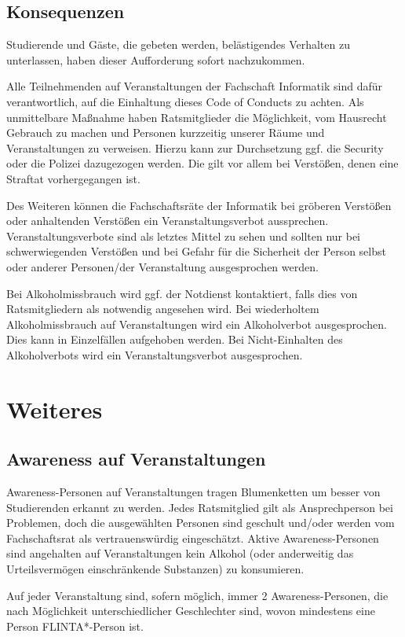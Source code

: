 \documentclass{article}
\begin{document}
\subsection{Konsequenzen}
Studierende und Gäste, die gebeten werden, belästigendes Verhalten zu unterlassen, haben dieser Aufforderung sofort nachzukommen.

Alle Teilnehmenden auf Veranstaltungen der Fachschaft Informatik sind dafür verantwortlich, auf die Einhaltung dieses Code of Conducts zu achten. Als unmittelbare Maßnahme 
haben Ratsmitglieder die Möglichkeit, vom Hausrecht Gebrauch zu machen und Personen kurzzeitig unserer Räume und Veranstaltungen zu verweisen. Hierzu kann zur Durchsetzung 
ggf. die Security oder die Polizei dazugezogen werden. Die gilt vor allem bei Verstößen, denen eine Straftat vorhergegangen ist.
 
Des Weiteren können die Fachschaftsräte der Informatik bei gröberen Verstößen oder anhaltenden Verstö\-ßen ein Veranstaltungsverbot aussprechen. Veranstaltungsverbote sind als
letztes Mittel zu sehen und sollten nur bei schwerwiegenden Verstößen und bei Gefahr für die Sicherheit der Person selbst oder anderer Personen/der Veranstaltung ausgesprochen 
werden.

Bei Alkoholmissbrauch wird ggf. der Notdienst kontaktiert, falls dies von Ratsmitgliedern als notwendig angesehen wird. Bei wiederholtem Alkoholmissbrauch auf Veranstaltungen 
wird ein Alkoholverbot ausgesprochen. Dies kann in Einzelfällen aufgehoben werden. Bei Nicht-Einhalten des Alkoholverbots wird ein Veranstaltungsverbot ausgesprochen.

\section{Weiteres}

\subsection{Awareness auf Veranstaltungen}
Awareness-Personen auf Veranstaltungen tragen Blumenketten um besser von Studierenden erkannt zu werden. Jedes Ratsmitglied gilt als Ansprechperson bei Problemen, doch die 
ausgewählten Personen sind geschult und/oder werden vom Fachschaftsrat als vertrauenswürdig eingeschätzt. Aktive Awareness-Personen sind angehalten auf Veranstaltungen kein
Alkohol (oder anderweitig das Urteilsvermögen einschränkende Substanzen) zu konsumieren.

Auf jeder Veranstaltung sind, sofern möglich, immer 2 Awareness-Personen, die nach Mög\-lich\-keit unterschiedlicher Geschlechter sind, wovon mindestens eine Person
FLINTA*-Person ist. %
\end{document}
